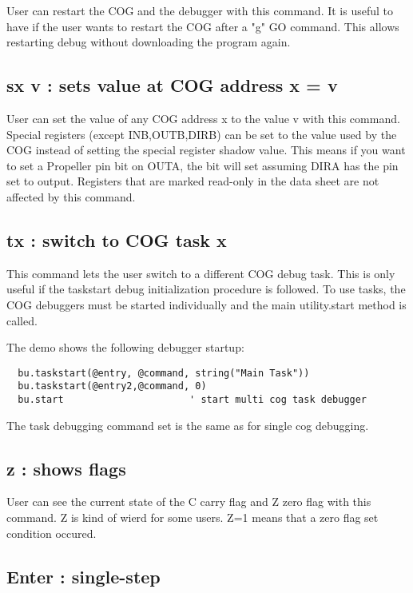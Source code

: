 \documentclass{article}
\numberwithin{equation}{section} %
\begin{document}
User can restart the COG and the debugger with this command. It is useful to have
if the user wants to restart the COG after a "g" GO command. This allows restarting
debug without downloading the program again.


\subsection{sx v   : sets value at COG address x = v}

User can set the value of any COG address x to the value v with this command. Special
registers (except INB,OUTB,DIRB) can be set to the value used by the COG instead of
setting the special register shadow value. This means if you want to set a Propeller
pin bit on OUTA, the bit will set assuming DIRA has the pin set to output. Registers
that are marked read-only in the data sheet are not affected by this command.


\subsection{tx     : switch to COG task x}

This command lets the user switch to a different COG debug task. This is only useful
if the taskstart debug initialization procedure is followed. To use tasks, the COG
debuggers must be started individually and the main utility.start method is called.

The demo shows the following debugger startup:

\begin{lstlisting}
  bu.taskstart(@entry, @command, string("Main Task"))
  bu.taskstart(@entry2,@command, 0)
  bu.start                      ' start multi cog task debugger
\end{lstlisting}


The task debugging command set is the same as for single cog debugging.


\subsection{z      : shows flags}

User can see the current state of the C carry flag and Z zero flag with this command.
Z is kind of wierd for some users. Z=1 means that a zero flag set condition occured.


\subsection{Enter  : single-step}
\end{document}
